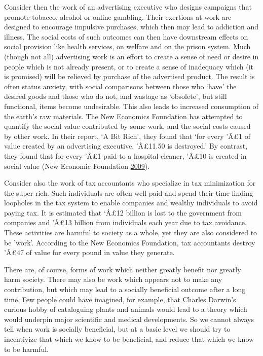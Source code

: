 \documentclass[]{tufte-handout}
\begin{document}
Consider then the work of an advertising executive who designs campaigns
that promote tobacco, alcohol or online gambling. Their exertions at
work are designed to encourage impulsive purchases, which then may lead
to addiction and illness. The social costs of such outcomes can then
have downstream effects on social provision like health services, on
welfare and on the prison system. Much (though not all) advertising work
is an effort to create a sense of need or desire in people which is not
already present, or to create a sense of inadequacy which (it is
promised) will be relieved by purchase of the advertised product. The
result is often status anxiety, with social comparisons between those
who `have' the desired goods and those who do not, and wastage as
`obsolete', but still functional, items become undesirable. This also
leads to increased consumption of the earth's raw materials. The New
Economics Foundation has attempted to quantify the social value
contributed by some work, and the social costs caused by other work. In
their report, `A Bit Rich', they found that `for every 'Â£1 of value
created by an advertising executive, 'Â£11.50 is destroyed.' By
contrast, they found that for every 'Â£1 paid to a hospital cleaner,
'Â£10 is created in social value (New Economic Foundation
\protect\hyperlink{ref-NewEconomicFoundation2009}{2009}).

Consider also the work of tax accountants who specialize in tax
minimization for the super rich. Such individuals are often well paid
and spend their time finding loopholes in the tax system to enable
companies and wealthy individuals to avoid paying tax. It is estimated
that `Â£12 billion is lost to the government from companies and 'Â£13
billion from individuals each year due to tax avoidance. These
activities are harmful to society as a whole, yet they are also
considered to be 'work'. According to the New Economics Foundation, tax
accountants destroy 'Â£47 of value for every pound in value they
generate.

There are, of course, forms of work which neither greatly benefit nor
greatly harm society. There may also be work which appears not to make
any contribution, but which may lead to a socially beneficial outcome
after a long time. Few people could have imagined, for example, that
Charles Darwin's curious hobby of cataloguing plants and animals would
lead to a theory which would underpin major scientific and medical
developments. So we cannot always tell when work is socially beneficial,
but at a basic level we should try to incentivize that which we know to
be beneficial, and reduce that which we know to be harmful.
\end{document}
